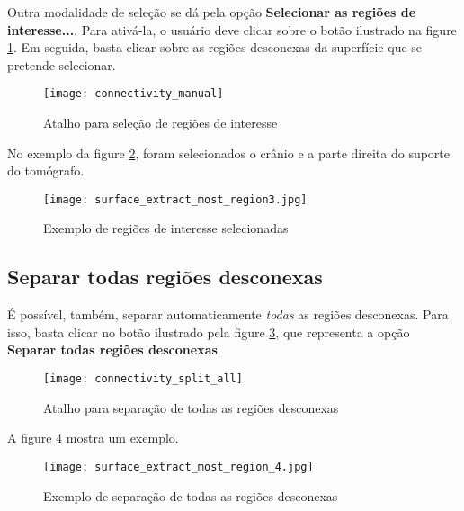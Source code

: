 Outra modalidade de seleção se dá pela opção \textbf{Selecionar as regiões de interesse...}.
Para ativá-la, o usuário deve clicar sobre o botão ilustrado na figure
\ref{fig:short_connectivity_manual}. Em seguida, basta clicar sobre as regiões desconexas
da superfície que se pretende selecionar.

\begin{figure}[!htb]
\centering
\texttt{[image: connectivity\_manual]}
\caption{Atalho para seleção de regiões de interesse}
\label{fig:short_connectivity_manual}
\end{figure}

No exemplo da figure \ref{fig:extract_most_region3}, foram selecionados o crânio e a parte
direita do suporte do tomógrafo.

\begin{figure}[!htb]
\centering
\texttt{[image: surface\_extract\_most\_region3.jpg]}
\caption{Exemplo de regiões de interesse selecionadas}
\label{fig:extract_most_region3}
\end{figure}


\subsection{Separar todas regiões desconexas}

É possível, também, separar automaticamente \textit{todas} as regiões desconexas. Para
isso, basta clicar no botão ilustrado pela figure \ref{fig:connectivity_split_all}, que
representa a opção \textbf{Separar todas regiões desconexas}.

\begin{figure}[!htb]
\centering
\texttt{[image: connectivity\_split\_all]}
\caption{Atalho para separação de todas as regiões desconexas}
\label{fig:connectivity_split_all}
\end{figure}

A figure \ref{fig:extrac_most_region_4} mostra um exemplo.

\begin{figure}[!htb]
\centering
\texttt{[image: surface\_extract\_most\_region\_4.jpg]}
\caption{Exemplo de separação de todas as regiões desconexas}
\label{fig:extrac_most_region_4}
\end{figure}

